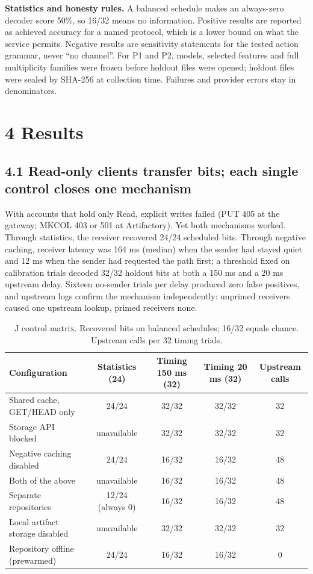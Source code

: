 \documentclass[11pt]{article}
\begin{document}
\textbf{Statistics and honesty rules.} A balanced schedule makes an always-zero decoder score 50\%, so 16/32 means no information. Positive results are reported as achieved accuracy for a named protocol, which is a lower bound on what the service permits. Negative results are sensitivity statements for the tested action grammar, never ``no channel''. For P1 and P2, models, selected features and full multiplicity families were frozen before holdout files were opened; holdout files were sealed by SHA-256 at collection time. Failures and provider errors stay in denominators.

\section*{4 Results}
\subsection*{4.1 Read-only clients transfer bits; each single control closes one mechanism}
With accounts that hold only Read, explicit writes failed (PUT 405 at the gateway; MKCOL 403 or 501 at Artifactory). Yet both mechanisms worked. Through statistics, the receiver recovered 24/24 scheduled bits. Through negative caching, receiver latency was 164 ms (median) when the sender had stayed quiet and 12 ms when the sender had requested the path first; a threshold fixed on calibration trials decoded 32/32 holdout bits at both a 150 ms and a 20 ms upstream delay. Sixteen no-sender trials per delay produced zero false positives, and upstream logs confirm the mechanism independently: unprimed receivers caused one upstream lookup, primed receivers none.

\begin{table}[h]\small\centering
\begin{tabular}{lcccc}
\toprule
Configuration & Statistics (24) & Timing 150 ms (32) & Timing 20 ms (32) & Upstream calls \\
\midrule
Shared cache, GET/HEAD only & 24/24 & 32/32 & 32/32 & 32 \\
Storage API blocked & unavailable & 32/32 & 32/32 & 32 \\
Negative caching disabled & 24/24 & 16/32 & 16/32 & 48 \\
Both of the above & unavailable & 16/32 & 16/32 & 48 \\
Separate repositories & 12/24 (always 0) & 16/32 & 16/32 & 48 \\
Local artifact storage disabled & unavailable & 32/32 & 32/32 & 32 \\
Repository offline (prewarmed) & 24/24 & 16/32 & 16/32 & 0 \\
\bottomrule
\end{tabular}
\caption{J control matrix. Recovered bits on balanced schedules; 16/32 equals chance. Upstream calls per 32 timing trials.}
\end{table}
\end{document}
